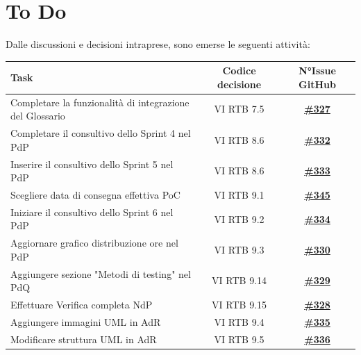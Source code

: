 \documentclass[a4paper,12pt]{article}
\newcommand{\ignoreglossary}{}
\begin{document}
\section{To Do}
Dalle discussioni e decisioni intraprese, sono emerse le seguenti attività:
\begin{center}
\small
\renewcommand{\arraystretch}{1.2} 
\begin{tabular}{|p{}|c|c|}
\hline
\rowcolor{gray!60} 
\textbf{Task} & \textbf{Codice decisione} & \textbf{N°Issue GitHub} \\
\hline
\rowcolor{white}
Completare la funzionalità di integrazione del Glossario & VI \ignoreglossary{RTB} 7.5 & \href{https://github.com/SWE-BitByBit/SWE-docs/issues/327}{\textbf{\#327}} \\
\hline
\rowcolor{gray!20}
Completare il consultivo dello Sprint 4 nel PdP & VI \ignoreglossary{RTB} 8.6 & \href{https://github.com/SWE-BitByBit/SWE-docs/issues/332}{\textbf{\#332}} \\
\hline
\rowcolor{white}
Inserire il consultivo dello Sprint 5 nel PdP & VI \ignoreglossary{RTB} 8.6 & \href{https://github.com/SWE-BitByBit/SWE-docs/issues/333}{\textbf{\#333}} \\
\hline
\rowcolor{gray!20}
Scegliere data di consegna effettiva PoC & VI \ignoreglossary{RTB} 9.1 & \href{https://github.com/SWE-BitByBit/SWE-docs/issues/345}{\textbf{\#345}} \\
\hline
\rowcolor{white}
Iniziare il consultivo dello Sprint 6 nel PdP & VI \ignoreglossary{RTB} 9.2 & \href{https://github.com/SWE-BitByBit/SWE-docs/issues/334}{\textbf{\#334}} \\
\hline
\rowcolor{gray!20}
Aggiornare grafico distribuzione ore nel PdP & VI \ignoreglossary{RTB} 9.3 & \href{https://github.com/SWE-BitByBit/SWE-docs/issues/330}{\textbf{\#330}} \\
\hline
\rowcolor{white}
Aggiungere sezione "Metodi di testing" nel PdQ & VI \ignoreglossary{RTB} 9.14 & \href{https://github.com/SWE-BitByBit/SWE-docs/issues/329}{\textbf{\#329}} \\
\hline
\rowcolor{gray!20}
Effettuare Verifica completa NdP & VI \ignoreglossary{RTB} 9.15 & \href{https://github.com/SWE-BitByBit/SWE-docs/issues/328}{\textbf{\#328}} \\
\hline
\rowcolor{white}
Aggiungere immagini UML in AdR & VI \ignoreglossary{RTB} 9.4 & \href{https://github.com/SWE-BitByBit/SWE-docs/issues/335}{\textbf{\#335}} \\
\hline
\rowcolor{gray!20}
Modificare struttura UML in AdR & VI \ignoreglossary{RTB} 9.5 & \href{https://github.com/SWE-BitByBit/SWE-docs/issues/336}{\textbf{\#336}} \\

\end{tabular}
\end{center}
\end{document}
